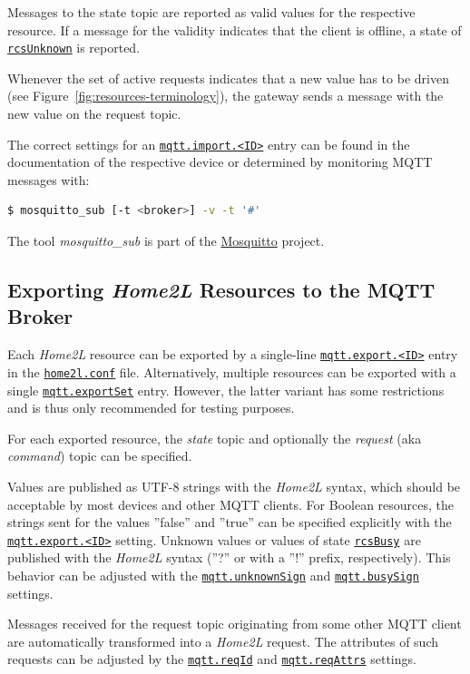 \documentclass[12pt,english,parskip=half,headheight=19pt]{scrreprt}
\newcommand{\idx}[1]{#1\index{#1}}
\newcommand{\refenv}[1]{\hyperref[env:#1]{\texttt{#1}}}        %
\newcommand{\reftool}[1]{\hyperref[tool:#1]{\texttt{\idx{#1}}}}
\newcommand{\refapic}[1]{\href{home2l-api_c/index.html}{\mbox{\texttt{#1}}}}            %
\begin{document}
Messages to the state topic are reported as valid values for the respective resource. If a message for the validity indicates that the client is offline, a state of \refapic{rcsUnknown} is reported.

Whenever the set of active requests indicates that a new value has to be driven (see Figure~\ref{fig:resources-terminology}), the gateway sends a message with the new value on the request topic.

The correct settings for an \refenv{mqtt.import.<ID>} entry can be found in the documentation of the respective device or determined by monitoring MQTT messages with:
\begin{lstlisting}[language=bash]
  $ mosquitto_sub [-t <broker>] -v -t '#'
\end{lstlisting}
The tool \textit{mosquitto\_sub} is part of the \href{https://mosquitto.org}{Mosquitto} project.



\subsection{Exporting \textit{Home2L} Resources to the MQTT Broker}
\label{sec:drvlib-mqtt-exporting}

Each \textit{Home2L} resource can be exported by a single-line \refenv{mqtt.export.<ID>} entry in the \reftool{home2l.conf} file. Alternatively, multiple resources can be exported with a single \refenv{mqtt.exportSet}
entry. However, the latter variant has some restrictions and is thus only recommended for testing purposes.

For each exported resource, the \textit{state} topic and optionally the \textit{request} (aka \textit{command})
topic can be specified.

Values are published as UTF-8 strings with the \textit{Home2L} syntax, which should be acceptable by most devices and other MQTT clients. For Boolean resources, the strings sent for the values ''false'' and ''true'' can be specified explicitly with the \refenv{mqtt.export.<ID>} setting.
Unknown values or values of state \refapic{rcsBusy} are published with the \textit{Home2L} syntax (''?'' or with a ''!'' prefix, respectively). This behavior can be adjusted with the \refenv{mqtt.unknownSign} and \refenv{mqtt.busySign} settings.

Messages received for the request topic originating from some other MQTT client are automatically transformed
into a \textit{Home2L} request. The attributes of such requests can be adjusted by the \refenv{mqtt.reqId} and \refenv{mqtt.reqAttrs} settings.
\end{document}
